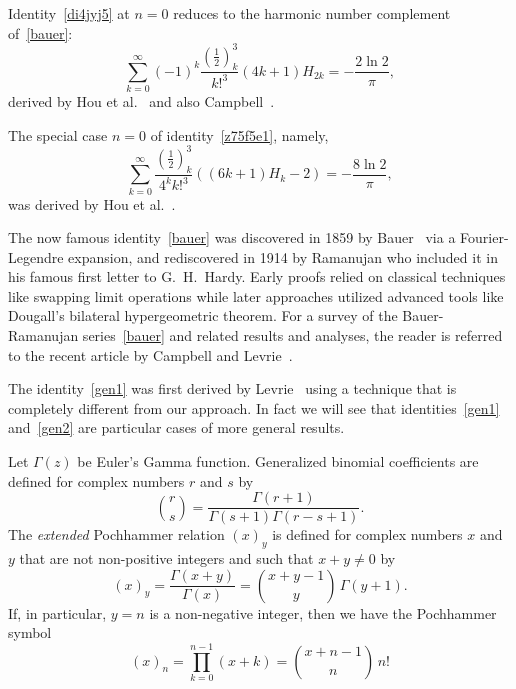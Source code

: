 \documentclass[12pt,reqno]{article}
\begin{document}
Identity~\eqref{di4jyj5} at $n=0$ reduces to the harmonic number complement of~\eqref{bauer}:
\begin{equation}
\sum_{k = 0}^\infty  {( - 1)^k \frac{{\left( {\frac{1}{2}} \right)_k^3 }}{{k!^3 }}\left( {4k + 1} \right)H_{2k} }  =  - \frac{2\ln 2}{\pi },
\end{equation}
derived by Hou et al.~\cite{hou24} and also Campbell~\cite{campbell26}.

The special case $n=0$ of identity~\eqref{z75f5e1}, namely,
\begin{equation}
\sum_{k = 0}^\infty  {\frac{{\left( {\frac{1}{2}} \right)_k^3 }}{{4^k k!^3 }}\left( {\left( {6k + 1} \right)H_k  - 2} \right)}  =  - \frac{{8\ln 2}}{\pi },
\end{equation}
was derived by Hou et al.~\cite{hou24}.

The now famous identity~\eqref{bauer} was discovered in 1859 by Bauer~\cite{bauer} via a Fourier-Legendre expansion, and rediscovered in 1914 by Ramanujan who included it in his famous first letter to G.~H.~Hardy. Early proofs relied on classical techniques like swapping limit operations while later approaches utilized advanced tools like Dougall's bilateral hypergeometric theorem. For a survey of the \mbox{Bauer-Ramanujan} series~\eqref{bauer} and related results and analyses, the reader is referred to the recent article by Campbell and Levrie~\cite{campbell24}.

The identity~\eqref{gen1} was first derived by Levrie~\cite[Theorem 7]{levrie10} using a technique that is completely different from our approach. In fact we will see that identities~\eqref{gen1} and~\eqref{gen2} are particular cases of more general results.

Let $\Gamma(z)$ be Euler's Gamma function. Generalized binomial coefficients are defined for complex numbers $r$ and $s$ by
\begin{equation}\label{y89d722}
\binom rs= \frac{{\Gamma (r + 1)}}{{\Gamma (s + 1)\Gamma (r - s + 1)}}.
\end{equation}
The {\it extended} Pochhammer relation $(x)_y$ is defined for complex numbers $x$ and $y$ that are not non-positive integers and such that $x+y\ne0$ by
\begin{equation}\label{ex_pochhammer}
\left( x \right)_y  = \frac{{\Gamma \left( {x + y} \right)}}{{\Gamma \left( x \right)}} = \binom{{x + y - 1}}{y}\,\Gamma \left( {y + 1} \right).
\end{equation}
If, in particular,  $y=n$ is a non-negative integer, then we have the Pochhammer symbol
\begin{equation}
\left( x \right)_n  = \prod_{k = 0}^{n - 1} {\left(x + k\right)}  = \binom{{x + n - 1}}{n}\,n!
\end{equation}
\end{document}

